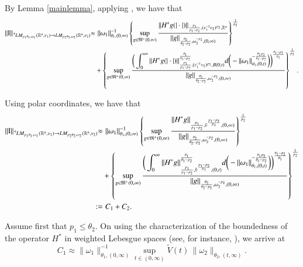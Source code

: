 \documentclass[11pt]{amsart}
\theoremstyle{plain}
\theoremstyle{definition}
\numberwithin{thm}{section}
\numberwithin{equation}{section}
\begin{document}
By  Lemma \ref{mainlemma}, applying \cite[Theorem~4.2, (c)]{mu_emb},  we have that
\begin{align*}
\|{\operatorname{I}}\|_{{\,^{^{\bf c}}\!} LM_{p_1{\theta}_1,{\omega}_1}({{\mathbb R}^n},v_1){\rightarrow} LM_{p_2{\theta}_2,{\omega}_2}({{\mathbb R}^n},v_2)} {\approx} & \,\, \|{\omega}_1\|_{{\theta}_1,(0,\infty)}^{-1} \left\{\sup_{g\in {\mathfrak M}^+{(0,{\infty})}} {\frac{\displaystyle { \|H^*g(|\cdot|)\|_{\frac{p_1}{p_1 - p_2},(v_1^{-1}v_2)^{p_2},{{\mathbb R}^n}}}}{\displaystyle {\|g\|_{\frac{{\theta}_2}{{\theta}_2 - p_2},{\omega}_2^{-p_2},(0,\infty)}}}} \right\}^{\frac{1}{p_2}} \\
& + \left\{\sup_{g\in {\mathfrak M}^+{(0,{\infty})}} {\frac{\displaystyle {\bigg(\int_0^{\infty} \|H^* g(|\cdot|)\|_{\frac{p_1}{p_1 - p_2},(v_1^{-1}v_2)^{p_2},B(0,t)}^{\frac{{\theta}_1}{{\theta}_1 - p_2}} d \bigg( - \|{\omega}_1\|_{{\theta}_1,(0,t)}^{- \frac{{\theta}_1 p_2}{{\theta}_1 - p_2}} \bigg)\bigg)^{\frac{{\theta}_1 - p_2}{{\theta}_1}}}}{\displaystyle {\|g\|_{\frac{{\theta}_2}{{\theta}_2 - p_2},{\omega}_2^{-p_2},(0,\infty)}}}} \right\}^{\frac{1}{p_2}}.
\end{align*}

Using polar coordinates, we have that
\begin{align*}
\|{\operatorname{I}}\|_{{\,^{^{\bf c}}\!} LM_{p_1{\theta}_1,{\omega}_1}({{\mathbb R}^n},v_1){\rightarrow} LM_{p_2{\theta}_2,{\omega}_2}({{\mathbb R}^n},v_2)} {\approx} & \,\, \|{\omega}_1\|_{{\theta}_1,(0,\infty)}^{-1} \left\{\sup_{g\in {\mathfrak M}^+{(0,{\infty})}} {\frac{\displaystyle { \|H^*g\|_{\frac{p_1}{p_1-p_2},{\tilde v}^{\frac{p_1-p_2}{p_1}},(0,\infty)}}}{\displaystyle {\|g\|_{\frac{{\theta}_2}{{\theta}_2-p_2},{\omega}_2^{-p_2},(0,\infty)}}}}\right\}^{\frac{1}{p_2}} \notag \\
& + \left\{\sup_{g\in {\mathfrak M}^+{(0,{\infty})}} {\frac{\displaystyle {\bigg(\int_0^{\infty} \|H^*g\|_{\frac{p_1}{p_1-p_2},{\tilde v}^{\frac{p_1-p_2}{p_1}},(0,t)}^{\frac{{\theta}_1}{{\theta}_1-p_2}} d\bigg(-\|{\omega}_1\|_{{\theta}_1,(0,t)}^{-\frac{{\theta}_1p_2}{{\theta}_1-p_2}}\bigg)\bigg)^{\frac{{\theta}_1-p_2}{{\theta}_1}}}}{\displaystyle {\|g\|_{\frac{{\theta}_2}{{\theta}_2-p_2},{\omega}_2^{-p_2},(0,\infty)}}}}\right\}^{\frac{1}{p_2}}\\
:= & \,\, C_1 + C_2.
\end{align*}

Assume first that $p_1\leq {\theta}_2$. On using the characterization of the boundedness of the operator $H^*$ in weighted Lebesgue spaces (see, for instance, \cites{ok,kp}), we arrive at
\begin{equation*}
C_1 {\approx}  \|{\omega}_1\|_{{\theta}_1,(0,\infty)}^{-1} \sup_{t\in (0,\infty)} \widetilde V(t)\,
\|{\omega}_2\|_{{\theta}_2,(t,\infty)}.
\end{equation*}
\end{document}

